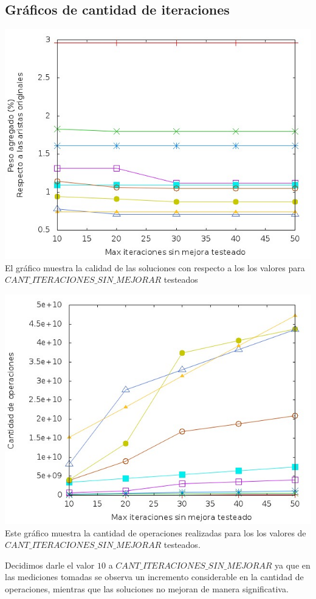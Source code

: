 \documentclass[11pt, a4paper, spanish]{article}
\begin{document}
\newpage
\subsection{Gr\'aficos de cantidad de iteraciones}

\begin{center}
\centering \includegraphics[scale=0.40]{img/VariacionItSinMejora.jpg}\\
\small{El gr\'afico muestra la calidad de las soluciones con respecto a los los valores para $CANT\_ITERACIONES\_SIN\_MEJORAR$ testeados}\\
\end{center}
\begin{center}
\centering \includegraphics[scale=0.40]{img/VariacionItSinMejoraComplejidad.jpg}\\
\small{Este gr\'afico muestra la cantidad de operaciones realizadas para los los valores de $CANT\_ITERACIONES\_SIN\_MEJORAR$ testeados.}\\
\end{center}
Decidimos darle el valor $10$ a $CANT\_ITERACIONES\_SIN\_MEJORAR$ ya que en las mediciones tomadas se observa un incremento considerable en la cantidad de operaciones, mientras que las soluciones no mejoran de manera significativa.\\
\end{document}
